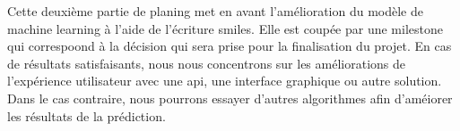 Cette deuxième partie de planing met en avant l'amélioration du modèle de machine learning à l'aide de l'écriture \acrshort{smiles}.
Elle est coupée par une milestone qui correspoond à la décision qui sera prise pour la finalisation du projet. En cas de résultats satisfaisants, nous nous concentrons sur les améliorations de l'expérience utilisateur avec une \acrshort{api}, une interface graphique ou autre solution.
Dans le cas contraire, nous pourrons essayer d'autres algorithmes afin d'améiorer les résultats de la prédiction.